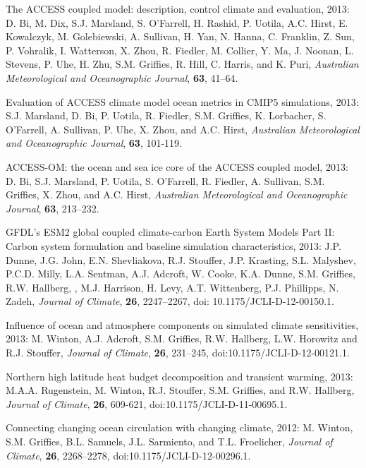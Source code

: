 \begin{etaremune}
\item The ACCESS coupled model: description, control climate and
  evaluation, 2013: D. Bi, M. Dix, S.J. Marsland, S. O'Farrell, H. Rashid, P. Uotila, A.C. Hirst, E. Kowalczyk, M. Golebiewski,
  A. Sullivan, H. Yan, N. Hanna, C. Franklin, Z. Sun, P. Vohralik, I. Watterson, X. Zhou, R. Fiedler, M. Collier, Y. Ma, J. Noonan,
  L. Stevens, P. Uhe, H. Zhu, S.M. Grif\/f\/ies, R. Hill, C. Harris, and K. Puri, {\it Australian Meteorological and
    Oceanographic Journal}, {\bf 63}, 41--64.

\item Evaluation of ACCESS climate model ocean metrics in CMIP5 simulations, 2013: S.J. Marsland, D. Bi, P. Uotila, R. Fiedler, S.M. Grif\/f\/ies, K. Lorbacher, S. O'Farrell, A. Sullivan, P. Uhe, X. Zhou, and A.C. Hirst, {\it Australian Meteorological and
    Oceanographic Journal}, {\bf 63}, 101-119.

\item ACCESS-OM: the ocean and sea ice core of the ACCESS coupled model, 2013: D. Bi, S.J. Marsland, P. Uotila, S. O'Farrell, R. Fiedler, A. Sullivan, S.M. Grif\/f\/ies, X. Zhou, and A.C. Hirst, {\it Australian Meteorological and Oceanographic Journal}, {\bf 63}, 213--232.

\item GFDL’s ESM2 global coupled climate-carbon Earth System Models Part II: Carbon system formulation and baseline simulation characteristics, 2013: J.P. Dunne, J.G. John, E.N. Shevliakova, R.J. Stouffer, J.P. Krasting, S.L. Malyshev, P.C.D. Milly,  L.A. Sentman, A.J. Adcroft, W. Cooke, K.A. Dunne, S.M. Grif\/f\/ies, R.W. Hallberg, , M.J. Harrison, H. Levy,  A.T. Wittenberg, P.J. Phillipps, N. Zadeh, {\it Journal of Climate},  {\bf 26}, 2247--2267, doi: 10.1175/JCLI-D-12-00150.1.

\item Influence of ocean and atmosphere components on simulated climate sensitivities, 2013: M. Winton, A.J. Adcroft, S.M. Grif\/f\/ies, R.W. Hallberg, L.W. Horowitz and R.J. Stouffer, {\it Journal of Climate}, {\bf 26}, 231--245,
  doi:10.1175/JCLI-D-12-00121.1.

\item Northern high latitude heat budget decomposition and transient warming, 2013: M.A.A. Rugenstein, M. Winton, R.J. Stouffer, S.M. Grif\/f\/ies, and R.W. Hallberg, {\it Journal of Climate}, {\bf 26}, 609-621, doi:10.1175/JCLI-D-11-00695.1.

\item Connecting changing ocean circulation with changing climate, 2012: M. Winton, S.M. Grif\/f\/ies, B.L. Samuels, J.L. Sarmiento, and T.L. Froelicher, {\it Journal of Climate}, {\bf 26}, 2268--2278, doi:10.1175/JCLI-D-12-00296.1.


\end{etaremune}

